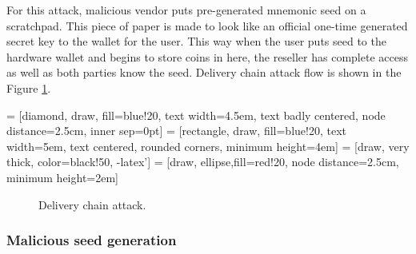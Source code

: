 \documentclass[
  printed, %
  table,   %
  nolof,     %
  nolot,     %
           oneside, color
]{fithesis3}
\begin{document}
For this attack, malicious vendor puts pre-generated mnemonic seed on a scratchpad. This piece of paper is made to look like an official one-time generated secret key to the wallet for the user. This way when the user puts seed to the hardware wallet and begins to store coins in here, the reseller has complete access as well as both parties know the seed. Delivery chain attack flow is shown in the Figure \ref{pict:delivery-chain-attack}.

 = [diamond, draw, fill=blue!20,
    text width=4.5em, text badly centered, node distance=2.5cm, inner sep=0pt]
 = [rectangle, draw, fill=blue!20,
    text width=5em, text centered, rounded corners, minimum height=4em]
 = [draw, very thick, color=black!50, -latex']
 = [draw, ellipse,fill=red!20, node distance=2.5cm,
    minimum height=2em]
\begin{figure}[H]
\center
{}
\caption{Delivery chain attack.}
\label{pict:delivery-chain-attack}
\end{figure}
\subsubsection{Malicious seed generation}
\end{document}
